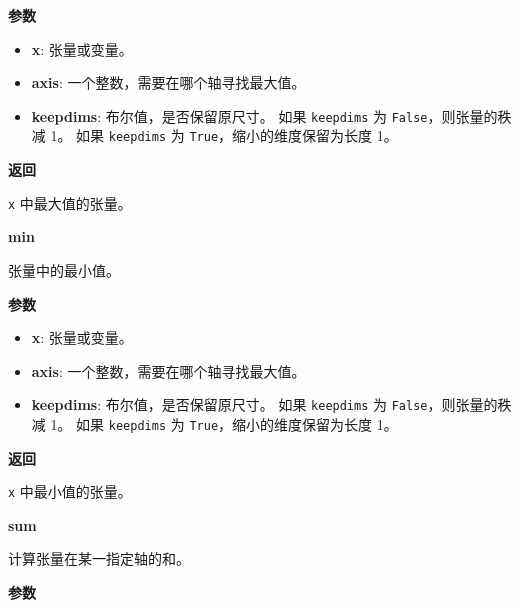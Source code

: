 \textbf{参数}

\begin{itemize}
\tightlist
\item
  \textbf{x}: 张量或变量。
\item
  \textbf{axis}: 一个整数，需要在哪个轴寻找最大值。
\item
  \textbf{keepdims}: 布尔值，是否保留原尺寸。 如果 \texttt{keepdims} 为
  \texttt{False}，则张量的秩减 1。 如果 \texttt{keepdims} 为
  \texttt{True}，缩小的维度保留为长度 1。
\end{itemize}

\textbf{返回}

\texttt{x} 中最大值的张量。


\textbf{min}\label{min}

\begin{Shaded}
\begin{Highlighting}[]
\OperatorTok{=}\OperatorTok{=}\NormalTok{)}
\end{Highlighting}
\end{Shaded}

张量中的最小值。

\textbf{参数}

\begin{itemize}
\tightlist
\item
  \textbf{x}: 张量或变量。
\item
  \textbf{axis}: 一个整数，需要在哪个轴寻找最大值。
\item
  \textbf{keepdims}: 布尔值，是否保留原尺寸。 如果 \texttt{keepdims} 为
  \texttt{False}，则张量的秩减 1。 如果 \texttt{keepdims} 为
  \texttt{True}，缩小的维度保留为长度 1。
\end{itemize}

\textbf{返回}

\texttt{x} 中最小值的张量。


\textbf{sum}\label{sum}

\begin{Shaded}
\begin{Highlighting}[]
\OperatorTok{=}\OperatorTok{=}\NormalTok{)}
\end{Highlighting}
\end{Shaded}

计算张量在某一指定轴的和。

\textbf{参数}

